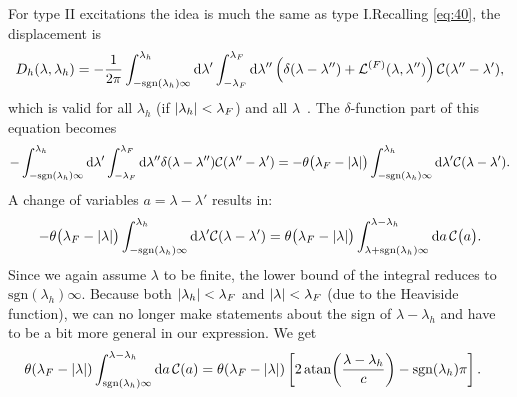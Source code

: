 \documentclass[11pt, a4paper]{report} %
\begin{document}
For type II excitations the idea is much the same as type I.\@ Recalling \cref{eq:40}, the displacement is
\begin{equation}
	D_h\qty(\lambda, \lambda_h) = -\frac{1}{2\pi}  \int_{-\textrm{sgn}(\lambda_h)\infty}^{\lambda_h} \dd \lambda' \int_{-\lambda_F}^{\lambda_F} \dd \lambda'' \left(\delta\qty(\lambda-\lambda'') + \mathcal{L}^{(F)}\qty(\lambda,\lambda'') \right)\mathcal{C}\qty(\lambda''-\lambda'),
\end{equation}
which is valid for all \(\lambda_h\) (if \(\abs{\lambda_h} < \lambda_F\)) and all \(\lambda\)~\cite{Caux2015}.
The \(\delta\)-function part of this equation becomes
\begin{align}
	-\int_{-\textrm{sgn}(\lambda_h)\infty}^{\lambda_h} \dd \lambda' \int_{-\lambda_F}^{\lambda_F} \dd \lambda'' \delta\qty(\lambda-\lambda'') \mathcal{C}\qty(\lambda''-\lambda') 
		= - \theta\qty\big(\lambda_F - \abs{\lambda}) \int_{-\textrm{sgn}(\lambda_h)\infty}^{\lambda_h} \dd \lambda'     \mathcal{C}\qty(\lambda-\lambda').
\end{align}
A change of variables \(a=\lambda-\lambda'\) results in:
\begin{align}
	 - \theta\qty\big(\lambda_F - \abs{\lambda}) \int_{-\textrm{sgn}(\lambda_h)\infty}^{\lambda_h} \dd \lambda'     \mathcal{C}\qty(\lambda-\lambda') = 
	  \theta\qty\big(\lambda_F - \abs{\lambda}) \int_{\lambda+\textrm{sgn}(\lambda_h)\infty}^{\lambda-\lambda_h} \dd a \, \mathcal{C}\qty\big(a).
\end{align}
Since we again assume \(\lambda\) to be finite, the lower bound of the integral reduces to \(\textrm{sgn}(\lambda_h)\infty\).
Because both \({\abs{\lambda_h} < \lambda_F}\) and \({\abs{\lambda} < \lambda_F}\) (due to the Heaviside function), we can no longer make statements about the sign of \(\lambda-\lambda_h\) and have to be a bit more general in our expression.
We get
\begin{align}
	  \theta(\lambda_F - \abs{\lambda}) \int_{\textrm{sgn}(\lambda_h)\infty}^{\lambda-\lambda_h} \dd a \, \mathcal{C}(a) 
	  &= \theta(\lambda_F - \abs{\lambda}) \left[2 \atan(\frac{\lambda-\lambda_h}{c}) - \textrm{sgn}(\lambda_h)\pi\right].
\end{align}
\end{document}
